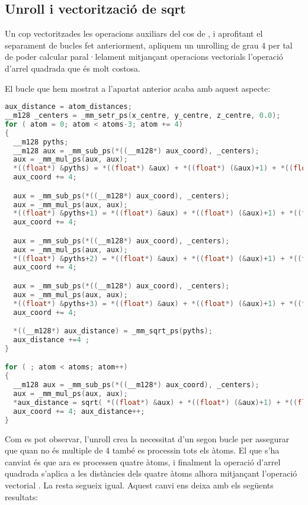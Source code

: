 
\subsection{Unroll i vectorització de sqrt}

Un cop vectoritzades les operacions auxiliars del cos de , i aprofitant el separament de bucles fet anteriorment, apliquem un unrolling de grau 4 per tal de poder calcular paral·lelament mitjançant operacions vectorials l'operació d'arrel quadrada que és molt costosa.

El bucle que hem mostrat a l'apartat anterior acaba amb aquest aspecte:

\begin{lstlisting}[label=vect2, caption=Unrolling i vectorització de pythagoras, language=C]
aux_distance = atom_distances;
__m128 _centers = _mm_setr_ps(x_centre, y_centre, z_centre, 0.0);
for ( atom = 0; atom < atoms-3; atom += 4)
{
  __m128 pyths;
  __m128 aux = _mm_sub_ps(*((__m128*) aux_coord), _centers);
  aux = _mm_mul_ps(aux, aux);
  *((float*) &pyths) = *((float*) &aux) + *((float*) (&aux)+1) + *((float*) (&aux)+2);
  aux_coord += 4;

  aux = _mm_sub_ps(*((__m128*) aux_coord), _centers);
  aux = _mm_mul_ps(aux, aux);
  *((float*) &pyths+1) = *((float*) &aux) + *((float*) (&aux)+1) + *((float*) (&aux)+2);
  aux_coord += 4;

  aux = _mm_sub_ps(*((__m128*) aux_coord), _centers);
  aux = _mm_mul_ps(aux, aux);
  *((float*) &pyths+2) = *((float*) &aux) + *((float*) (&aux)+1) + *((float*) (&aux)+2);
  aux_coord += 4;

  aux = _mm_sub_ps(*((__m128*) aux_coord), _centers);
  aux = _mm_mul_ps(aux, aux);
  *((float*) &pyths+3) = *((float*) &aux) + *((float*) (&aux)+1) + *((float*) (&aux)+2);
  aux_coord += 4;

  *((__m128*) aux_distance) = _mm_sqrt_ps(pyths);
  aux_distance +=4 ;
}

for ( ; atom < atoms; atom++)
{
  __m128 aux = _mm_sub_ps(*((__m128*) aux_coord), _centers);
  aux = _mm_mul_ps(aux, aux);
  *aux_distance = sqrt( *((float*) &aux) + *((float*) (&aux)+1) + *((float*) (&aux)+2) );
  aux_coord += 4; aux_distance++;
}
\end{lstlisting}

Com es pot observar, l'unroll crea la necessitat d'un segon bucle per assegurar que quan  no és multiple de 4 també es processin tots els àtoms. El que s'ha canviat és que ara es processen quatre àtoms, i finalment la operació d'arrel quadrada s'aplica a les distàncies dels quatre àtoms alhora mitjançant l'operació vectorial . La resta segueix igual. Aquest canvi ens deixa amb els següents resultats:

